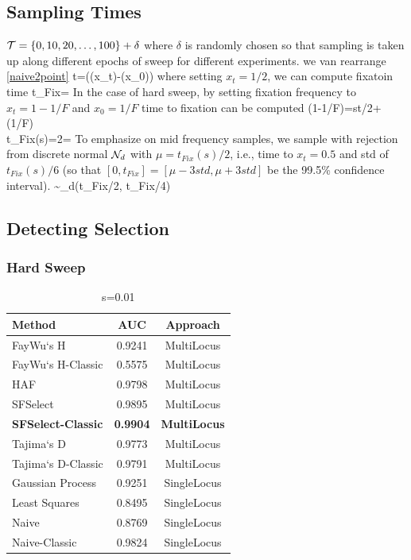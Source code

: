 \subsection{Sampling Times}
${\cal T}=\{0,10,20,\ldots ,100\} + \delta$ where $\delta$ is randomly chosen so that sampling is taken up along different epochs of sweep for different experiments.
we van rearrange \eqref{naive2point}
\beq
t=(\nu(x_t)-\nu(x_0))
\eeq
where setting $x_t=1/2$, we can compute fixatoin time 
\beq
t_{Fix}=
\eeq
In the case of hard sweep, by setting fixation frequency to $x_t=1-1/F$ and $x_0=1/F$ time to fixation can be computed
\beq
\eta(1-1/F)=st/2+\eta(1/F)\\
t_{Fix}(s)=2=
\eeq
To emphasize on mid frequency samples, we sample with rejection from discrete normal ${\cal N}_d$ with $\mu=t_{Fix}(s)/2$, i.e., time to $x_t=0.5$ and std of $t_{Fix}(s)/6$ (so that $[0,t_{Fix}]=[\mu-3std, \mu+3std]$ be the 99.5\% confidence interval).
\beq
\delta \sim \Nc_d(t_{Fix}/2, t_{Fix}/4)
\eeq
\subsection{Detecting Selection}

\subsubsection{Hard Sweep}
\begin{table}
  \begin{center}
    \begin{tabular}{l|c|c}
Method&AUC&Approach \\
\hline
FayWu`s  H&0.9241&MultiLocus \\
FayWu`s  H-Classic&0.5575&MultiLocus \\
HAF&0.9798&MultiLocus \\
SFSelect&0.9895&MultiLocus \\
 \bf{SFSelect-Classic}& \bf{0.9904}& \bf{MultiLocus} \\
Tajima`s  D&0.9773&MultiLocus \\
Tajima`s  D-Classic&0.9791&MultiLocus \\
Gaussian  Process&0.9251&SingleLocus \\
Least  Squares&0.8495&SingleLocus \\
Naive&0.8769&SingleLocus \\
Naive-Classic&0.9824&SingleLocus \\
    \end{tabular}
  \end{center}
  \caption{s=0.01}
\end{table}


